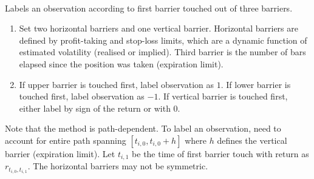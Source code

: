 \documentclass[a4paper,oneside,openany]{book}
\begin{document}
\begin{method} \\
Labels an observation according to first barrier touched out of three barriers.
\begin{enumerate}[label=\roman*.]
\setlength{\itemsep}{0pt}
\item Set two horizontal barriers and one vertical barrier. Horizontal barriers are defined by profit-taking and stop-loss limits, which are a dynamic function of estimated volatility (realised or implied). Third barrier is the number of bars elapsed since the position was taken (expiration limit).
\item If upper barrier is touched first, label observation as $1$. If lower barrier is touched first, label observation as $-1$. If vertical barrier is touched first, either label by sign of the return or with $0$.
\end{enumerate}
Note that the method is path-dependent. To label an observation, need to account for entire path spanning $[t_{i,0}, t_{i,0} + h]$ where $h$ defines the vertical barrier (expiration limit). Let $t_{i,1}$ be the time of first barrier touch with return as $r_{t_{i,0}, t_{i,1}}$. The horizontal barriers may not be symmetric.
\end{method}
\end{document}
